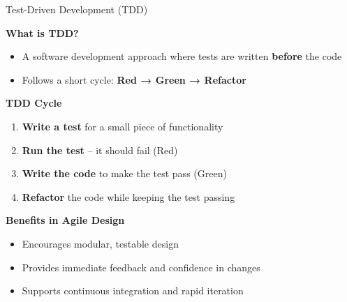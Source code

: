 \begin{frame}{Test-Driven Development (TDD)}
	
	\textbf{What is TDD?}
	\begin{itemize}
		\item A software development approach where tests are written \textbf{before} the code
		\item Follows a short cycle: \textbf{Red → Green → Refactor}
	\end{itemize}
	\pause
	\vspace{1em}
	\textbf{TDD Cycle}
	\begin{enumerate}
		\item \textbf{Write a test} for a small piece of functionality
		\item \textbf{Run the test} – it should fail (Red)
		\item \textbf{Write the code} to make the test pass (Green)
		\item \textbf{Refactor} the code while keeping the test passing
	\end{enumerate}
	\pause
	\vspace{1em}
	\textbf{Benefits in Agile Design}
	\begin{itemize}
		\item Encourages modular, testable design
		\item Provides immediate feedback and confidence in changes
		\item Supports continuous integration and rapid iteration
	\end{itemize}
	
\end{frame}

